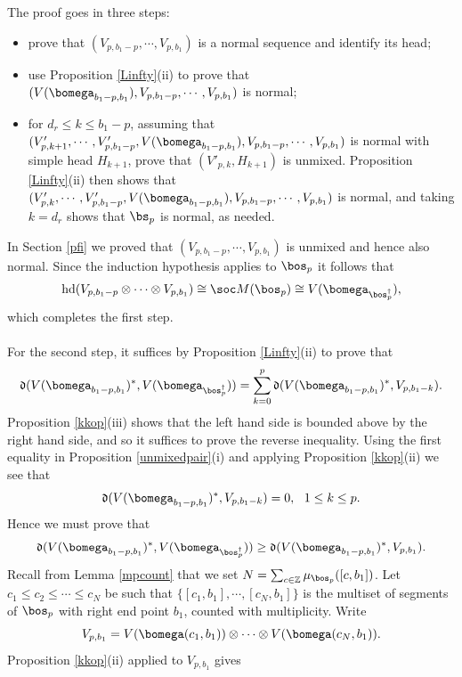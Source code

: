 \documentclass[11pt,reqno]{amsart}
\theoremstyle{definition} \newtheorem*{defn}{Definition}
\theoremstyle{definition}
\newenvironment{pf}{\proof}{\endproof}
\numberwithin{equation}{section}
\newcommand{\lie}[1]{\mathfrak{#1}}
\begin{document}
\begin{pf} The proof goes in three steps:
\begin{itemize}
    \item prove that $(V_{p,b_1-p},\cdots, V_{p,b_1})$ is a normal sequence and identify its head;
    \item use Proposition \ref{Linfty}(ii) to prove that $(V(\bomega_{b_1-p, b_1}), V_{p,b_1-p},\cdots, V_{p,b_1})$ is normal;
    \item for $d_r\le k\le b_1-p$, assuming that
    $(V'_{p,k+1},\cdots , V'_{p,b_1-p}, V(\bomega_{b_1-p, b_1}),V_{p,b_1-p},\cdots, V_{p,b_1})$ is normal
    with simple head $H_{k+1}$, prove that $(V'_{p,k}, H_{k+1})$ is unmixed. Proposition
    \ref{Linfty}(ii) then shows that
    $(V'_{p,k},\cdots , V'_{p,b_1-p}, V(\bomega_{b_1-p, b_1}),V_{p,b_1-p},\cdots, V_{p,b_1})$ is normal,
    and taking $k=d_r$ shows that $\bs_p$ is normal, as needed.
\end{itemize}
In Section \ref{pfi} we proved that $(V_{p,b_1-p},\cdots, V_{p,b_1})$ is unmixed and hence also
normal. Since the induction hypothesis applies to $\bos_p$ it follows that
$${\rm hd}(V_{p,b_1-p}\otimes \cdots \otimes  V_{p,b_1})\cong \soc M(\bos_p)\cong V(\bomega_{\bos_p^\dagger}),$$
which completes the first step.
\\\\
For the second step, it suffices by Proposition \ref{Linfty}(ii) to prove that
\begin{equation}\label{ineqSp}
    \lie d (V(\bomega_{b_1-p,b_1})^*, V(\bomega_{\bos_p^\dagger})) = \sum_{k=0}^p \lie d (V(\bomega_{b_1-p,b_1})^*, V_{p,b_1-k}).
\end{equation}
Proposition \ref{kkop}(iii) shows that the left hand side is bounded above by the right hand side,
and so it suffices to prove the reverse inequality. Using the first equality in Proposition
\ref{unmixedpair}(i) and applying Proposition \ref{kkop}(ii) we see that
$$\lie d (V(\bomega_{b_1-p,b_1})^*, V_{p,b_1-k})=0,\ \ 1\le k\le p.$$
Hence we must prove that
$$\lie d (V(\bomega_{b_1-p,b_1})^*, V(\bomega_{\bos_p^\dagger})) \geq \lie d (V(\bomega_{b_1-p,b_1})^*, V_{p,b_1}).$$
Recall from Lemma \ref{mpcount} that we set $N=\sum_{c\in \mathbb Z}\mu_{\bos_p}([c,b_1])$. Let
$c_1\le c_2\le\cdots\le c_N$ be such that $\{[c_1,b_1],\cdots, [c_{N},b_1]\}$ is the multiset of
segments of $\bos_p$ with right end point $b_1$, counted with multiplicity. Write
$$V_{p,b_1} = V(\bomega(c_1,b_1))\otimes\cdots\otimes V(\bomega(c_N, b_1)).$$
Proposition \ref{kkop}(ii) applied to $V_{p,b_1}$ gives

\end{pf}
\end{document}
